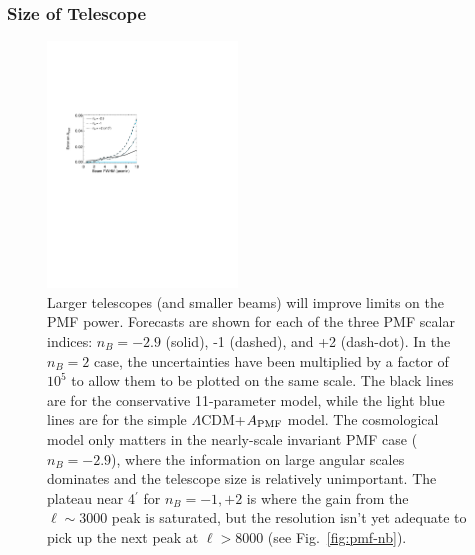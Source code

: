 \documentclass[apj]{emulateapj}
\newcommand{\apmf}{\ensuremath{A_{\rm PMF}}}
\newcommand{\lcdm}{\ensuremath{\Lambda}CDM}
\begin{document}
\subsubsection{Size of Telescope }


\begin{figure}[htb]\centering
\includegraphics[width=0.45\textwidth,clip,trim={2.cm 12.5cm 11cm 7.5cm}]{pmf_beam.pdf}
  \caption[]{ \label{fig:beam}
 Larger telescopes (and smaller beams) will improve limits on the PMF power. 
 Forecasts are shown for each of the three PMF scalar indices: $n_B = -2.9$ (solid), -1 (dashed), and +2 (dash-dot). 
   In the $n_B=2$ case, the uncertainties have been multiplied by a factor of $10^5$ to allow them to be plotted on the same scale. 
  The black lines are for the conservative 11-parameter model, while the light blue lines are for the simple \lcdm{}+\apmf{} model. 
  The cosmological model only matters in the nearly-scale invariant PMF case ($n_B=-2.9$), where the information on large angular scales dominates and the telescope size is relatively unimportant. 
  The plateau near 4$^\prime$ for $n_B=-1, +2$ is where the gain from the $\ell\sim3000$ peak is saturated, but the resolution isn't yet adequate to pick up the next peak at $\ell > 8000$ (see  Fig.~\ref{fig:pmf-nb}).  
    }
\end{figure}
\end{document}
